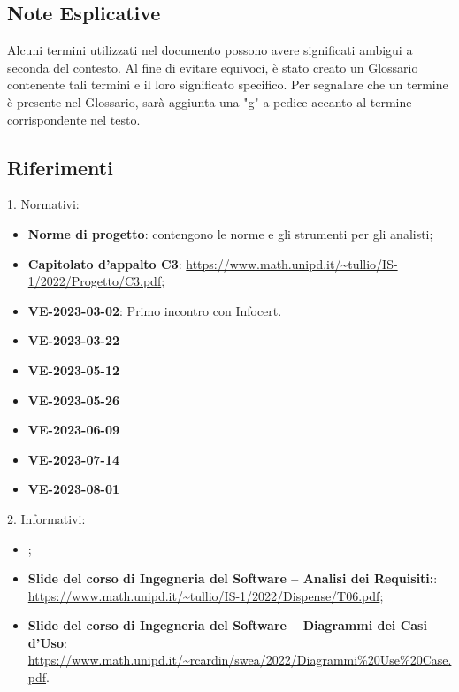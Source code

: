 \subsection{Note Esplicative}
Alcuni termini utilizzati nel documento possono avere significati ambigui a seconda del contesto. Al fine di evitare equivoci, è stato creato un Glossario contenente tali termini 
e il loro significato specifico. Per segnalare che un termine è presente nel Glossario, sarà aggiunta una "g" a pedice accanto al termine corrispondente nel testo.

\subsection{Riferimenti}
1. Normativi: 
\begin{itemize}
    \item \textbf{Norme di progetto}: contengono le norme e gli strumenti per gli analisti;
    \item \textbf{Capitolato d’appalto C3}: \url{https://www.math.unipd.it/~tullio/IS-1/2022/Progetto/C3.pdf};
    \item \textbf{VE-2023-03-02}: Primo incontro con Infocert.
    \item \textbf{VE-2023-03-22}
    \item \textbf{VE-2023-05-12}
    \item \textbf{VE-2023-05-26}
    \item \textbf{VE-2023-06-09}
    \item \textbf{VE-2023-07-14}
    \item \textbf{VE-2023-08-01}
\end{itemize}

2. Informativi: 
\begin{itemize}
    \item \textbf{\Glodocumento};
    \item \textbf{Slide del corso di Ingegneria del Software – Analisi dei Requisiti:}: \url{https://www.math.unipd.it/~tullio/IS-1/2022/Dispense/T06.pdf};
    \item \textbf{Slide del corso di Ingegneria del Software – Diagrammi dei Casi d’Uso}: \url{https://www.math.unipd.it/~rcardin/swea/2022/Diagrammi%20Use%20Case.pdf}.
\end{itemize}